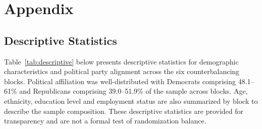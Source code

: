 \documentclass[12pt]{article}
\begin{document}
\printbibliography[title={References}]

\appendix
\section{Appendix}

\subsection{Descriptive Statistics}
\label{sec:descriptive}

Table~\ref{tab:descriptive} below presents descriptive statistics for demographic characteristics and political party alignment across the six counterbalancing blocks. Political affiliation was well-distributed with Democrats comprising 48.1--61\% and Republicans comprising 39.0--51.9\% of the sample across blocks. Age, ethnicity, education level and employment status are also summarized by block to describe the sample composition. These descriptive statistics are provided for transparency and are not a formal test of randomization balance.
\end{document}
